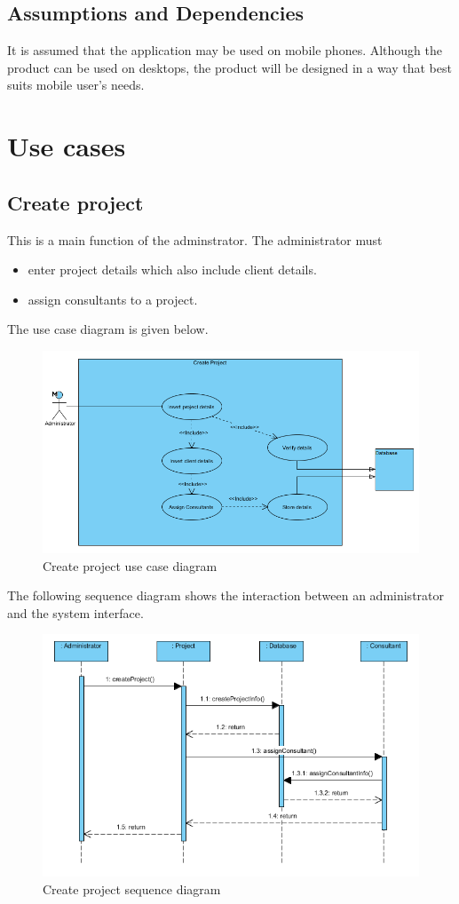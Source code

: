 \documentclass[a4paper, 12pt, oneside]{article}
\begin{document}
\subsection{Assumptions and Dependencies}
It is assumed that the application may be used on mobile phones. Although the product can be used on desktops, the product will be designed in a way that best suits mobile user’s needs.

\newpage
\section{Use cases}
\subsection{Create project}
This is a main function of the adminstrator. The administrator must
\begin{itemize}
	\item enter project details which also include client details.
	\item assign consultants to a project.
\end{itemize}
The use case diagram is given below.
\\
\begin{figure}[h!]
\includegraphics[width = \linewidth]{images/createProjectUCD.png}
	\caption{Create project use case diagram}
\end{figure}
\newpage
 The following sequence diagram shows the interaction between an administrator and the system interface. 
\begin{figure}[h!]
\includegraphics[width = \linewidth]{images/createProject.png}
	\caption{Create project sequence diagram}
\end{figure}
\end{document}
